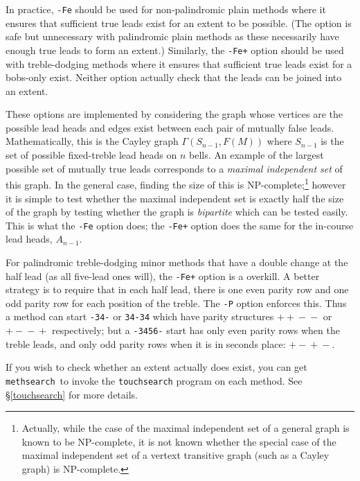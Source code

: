 \documentclass[a4paper,11pt,oneside]{book}
\makeatletter
\def\textitidx#1{\textit{#1}\index{#1}}
\newcommand{\oi}[1]{\index{#1@{\hspace*{-\optwidth}\texttt{-}\texttt{#1}}}}
\def\methsearch{\texttt{meth\-search}}
\newcommand{\sref}[1]{\hyperref[#1]{\S\ref{#1}}}
\makeatother
\begin{document}
In practice, \verb+-Fe+ should be used for non-palindromic plain methods 
where it ensures that sufficient true leads exist for an extent to be possible.
(The option is safe but unnecessary with palindromic plain methods as these
necessarily have enough true leads to form an extent.)
Similarly, the \verb^-Fe+^ option should be used with treble-dodging methods
where it ensures that sufficient true leads exist for a bobs-only exist.
Neither option actually check that the leads can be joined into an extent. 

These options are implemented by considering the graph 
whose vertices are the possible lead heads and edges exist between each pair
of mutually false leads.  Mathematically, this is the Cayley graph%
 $\Gamma(S_{n-1}, F(M))$ where $S_{n-1}$%
 is the set of
possible fixed-treble lead heads on $n$ bells.  An example of the 
largest possible set of mutually true leads corresponds to a \textitidx{maximal
independent set} of this graph.  In the general case, finding the size of this 
is NP-complete;\footnote{Actually, while the case of
the maximal independent set of a general graph is known to be NP-complete,
it is not known whether the special case of the maximal independent set of 
a vertext transitive graph (such as a Cayley graph) is NP-complete.}
however it is simple to test whether the maximal independent set is exactly 
half the size of the graph by testing whether the graph is 
\textitidx{bipartite} which can be tested easily.  This is what the \verb+-Fe+
option does; the \verb^-Fe+^ option does the same for the in-course lead heads,
$A_{n-1}$.

For palindromic treble-dodging minor methods that have a double change at 
the half lead (as all five-lead ones will), the \verb^-Fe+^ option is a
overkill.  A better strategy is to require that in each half lead, there 
is one even parity row and one odd parity row for each position
of the treble.  The \verb+-P+\oi{P} option enforces this.
Thus a method can start \verb+-34-+ or \verb+34-34+ which have 
parity structures $+{}+{}-{}-$ or $+{}-{}-{}+$ respectively; 
but a \verb+-3456-+ start has only even parity rows when the treble leads, 
and only odd parity rows when it is in seconds place: $+{}-{}+{}-$.

If you wish to check whether an extent actually does exist, you can 
get \methsearch\ to invoke the \texttt{touchsearch} program on each 
method.  See \sref{touchsearch} for more details.
\end{document}
